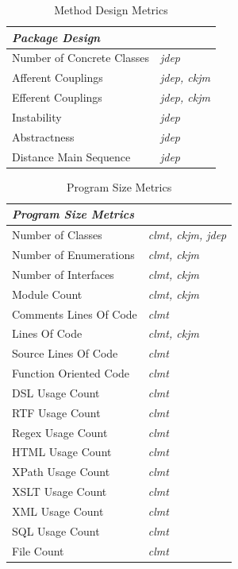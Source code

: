 \documentclass{sig-alternate}
\begin{document}
\begin{table}
\centering
\caption{Method Design Metrics}
\label{tbl:package-selected-metrics}
\begin{tabular}{l l}
 \hline
\multicolumn{2}{l}{\textit{\textbf{Package Design}}}\\
\hline
Number of Concrete Classes & \textit{jdep}\\
Afferent Couplings & \textit{jdep, ckjm}\\
Efferent Couplings & \textit{jdep, ckjm}\\
Instability & \textit{jdep}\\
Abstractness & \textit{jdep}\\
Distance Main Sequence & \textit{jdep}\\
\hline
\end{tabular}
\end{table}

\begin{table}
\centering
\caption{Program Size Metrics}
\label{tbl:size-selected-metrics}
\begin{tabular}{l l}
 \hline
\multicolumn{2}{l}{\textit{\textbf{Program Size Metrics}}}\\
\hline
Number of Classes & \textit{clmt, ckjm, jdep}\\
Number of Enumerations & \textit{clmt, ckjm}\\
Number of Interfaces & \textit{clmt, ckjm}\\
Module Count & \textit{clmt, ckjm}\\
Comments Lines Of Code & \textit{clmt}\\
Lines Of Code & \textit{clmt, ckjm}\\
Source Lines Of Code & \textit{clmt}\\
Function Oriented Code & \textit{clmt}\\
DSL Usage Count & \textit{clmt}\\
RTF Usage Count & \textit{clmt}\\
Regex Usage Count & \textit{clmt}\\
HTML Usage Count & \textit{clmt}\\
XPath Usage Count & \textit{clmt}\\
XSLT Usage Count & \textit{clmt}\\
XML Usage Count & \textit{clmt}\\
SQL Usage Count & \textit{clmt}\\
File Count & \textit{clmt}\\
\hline
\end{tabular}
\end{table}
\end{document}
